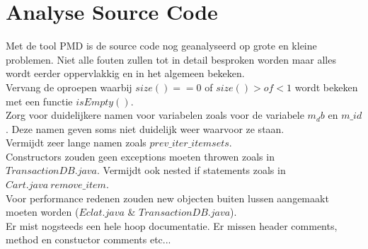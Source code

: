 \documentclass{article}
\begin{document}
\section{Analyse Source Code}
Met de tool PMD is de source code nog geanalyseerd op grote en kleine problemen. Niet alle fouten zullen tot in detail besproken worden maar alles wordt eerder oppervlakkig en in het algemeen bekeken.\\
Vervang de oproepen waarbij $size() == 0$ of $size() > of < 1$ wordt bekeken met een functie $isEmpty()$.\\
Zorg voor duidelijkere namen voor variabelen zoals voor de variabele $m_db$ en $m\_id$. Deze namen geven soms niet duidelijk weer waarvoor ze staan.\\
Vermijdt zeer lange namen zoals $prev\_iter\_itemsets$.\\
Constructors zouden geen exceptions moeten throwen zoals in $TransactionDB.java$. Vermijdt ook nested if statements zoals in $Cart.java\ remove\_item$.\\
Voor performance redenen zouden new objecten buiten lussen aangemaakt moeten worden ($Eclat.java$ \& $TransactionDB.java$).\\
Er mist nogsteeds een hele hoop documentatie. Er missen header comments, method en constuctor comments etc...
\end{document}
